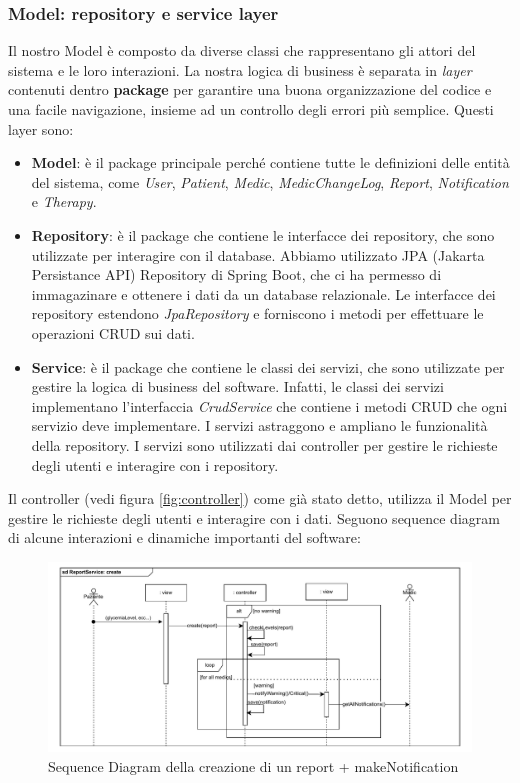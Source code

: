 \documentclass[a4paper]{article}
\begin{document}
\subsubsection{Model: repository e service layer}

Il nostro Model è composto da diverse classi che rappresentano gli attori del sistema e le loro interazioni.
La nostra logica di business è separata in \textit{layer}  contenuti dentro \textbf{package} 
per garantire una buona organizzazione del codice e una facile navigazione, insieme
ad un controllo degli errori più semplice.
Questi layer sono:
\begin{itemize}
  \item \textbf{Model}: è il package principale perché contiene tutte le definizioni delle entità del sistema, come \textit{User}, \textit{Patient}, \textit{Medic}, \textit{MedicChangeLog}, \textit{Report}, \textit{Notification} e \textit{Therapy}.
  \item \textbf{Repository}: è il package che contiene le interfacce dei repository, che sono utilizzate per interagire con il database. 
  Abbiamo utilizzato JPA (Jakarta Persistance API) Repository di Spring Boot, che ci ha permesso di immagazinare e ottenere i dati da un 
  database relazionale. 
  Le interfacce dei repository estendono \textit{JpaRepository} e forniscono i metodi per effettuare le operazioni CRUD sui dati.
  \item \textbf{Service}: è il package che contiene le classi dei servizi, che sono utilizzate per gestire la logica di business del software. 
  Infatti, le classi dei servizi implementano l'interfaccia \textit{CrudService} che contiene i metodi CRUD che ogni servizio deve implementare.
  I servizi astraggono e ampliano le funzionalità della repository.
  I servizi sono utilizzati dai controller per gestire le richieste degli utenti e interagire con i repository.
\end{itemize}
Il controller (vedi figura \ref{fig:controller}) come già stato detto, utilizza il Model per 
gestire le richieste degli utenti e interagire con i dati. 
Seguono sequence diagram di alcune interazioni e dinamiche importanti del software:
\begin{figure}[H]
  \begin{center}
    \includegraphics[width=1\textwidth]{sdReportCreate.pdf}
  \end{center}
  \caption{Sequence Diagram della creazione di un report + makeNotification} 
\end{figure}
\noindent
\end{document}

